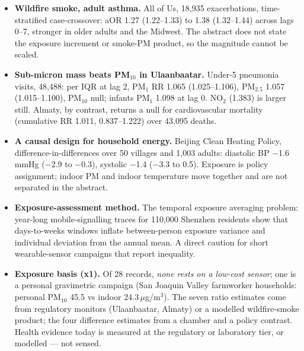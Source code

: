 \documentclass[10pt]{article}
\begin{document}
\footnotesize
\begin{itemize}

\item \textbf{Wildfire smoke, adult asthma.} All of Us, 18,935 exacerbations, time-stratified case-crossover: aOR 1.27 (1.22--1.33) to 1.38 (1.32--1.44) across lags 0--7, stronger in older adults and the Midwest. The abstract does not state the exposure increment or smoke-PM product, so the magnitude cannot be scaled.

\item \textbf{Sub-micron mass beats PM$_{10}$ in Ulaanbaatar.} Under-5 pneumonia visits, 48,488: per IQR at lag 2, PM$_1$ RR 1.065 (1.025--1.106), PM$_{2.5}$ 1.057 (1.015--1.100), PM$_{10}$ null; infants PM$_1$ 1.098 at lag 0. NO$_2$ (1.383) is larger still. Almaty, by contrast, returns a null for cardiovascular mortality (cumulative RR 1.011, 0.837--1.222) over 43,095 deaths.

\item \textbf{A causal design for household energy.} Beijing Clean Heating Policy, difference-in-differences over 50 villages and 1,003 adults: diastolic BP $-$1.6\,mmHg ($-$2.9 to $-$0.3), systolic $-$1.4 ($-$3.3 to 0.5). Exposure is policy assignment; indoor PM and indoor temperature move together and are not separated in the abstract.

\item \textbf{Exposure-assessment method.} The temporal exposure averaging problem: year-long mobile-signalling traces for 110,000 Shenzhen residents show that days-to-weeks windows inflate between-person exposure variance and individual deviation from the annual mean. A direct caution for short wearable-sensor campaigns that report inequality.

\item \textbf{Exposure basis (x1).} Of 28 records, \emph{none rests on a low-cost sensor}; one is a personal gravimetric campaign (San Joaquin Valley farmworker households: personal PM$_{10}$ 45.5 vs indoor 24.3\,$\mu$g/m$^3$). The seven ratio estimates come from regulatory monitors (Ulaanbaatar, Almaty) or a modelled wildfire-smoke product; the four difference estimates from a chamber and a policy contrast. Health evidence today is measured at the regulatory or laboratory tier, or modelled --- not sensed.

\end{itemize}

\vspace{2mm}
\end{document}
